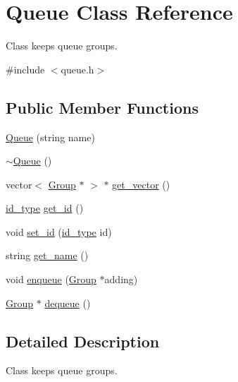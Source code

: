 \hypertarget{classQueue}{
\section{Queue Class Reference}
\label{d7/d56/classQueue}
}


Class keeps queue groups.  




{\ttfamily \#include $<$queue.h$>$}

\subsection*{Public Member Functions}
\begin{DoxyCompactItemize}
\item 
\hyperlink{classQueue_aee8e0d9677cef92e34f0347b73f64c97}{Queue} (string name)
\item 
\hyperlink{classQueue_a00d119db8fa3050da37746e82cbcf94f}{$\sim$Queue} ()
\item 
vector$<$ \hyperlink{classGroup}{Group} $\ast$ $>$ $\ast$ \hyperlink{classQueue_a6de27cfb498b3bc6000f63599f124c53}{get\_\-vector} ()
\item 
\hyperlink{types_8h_a0b60c08a3ab1435cccc5643d32d8ccee}{id\_\-type} \hyperlink{classQueue_a69f2c1cee4763ed7671a4710cc9748c2}{get\_\-id} ()
\item 
void \hyperlink{classQueue_ad29a81e51660af6071684ad3c5b063f1}{set\_\-id} (\hyperlink{types_8h_a0b60c08a3ab1435cccc5643d32d8ccee}{id\_\-type} id)
\item 
string \hyperlink{classQueue_ab68f53f6e69bbe4f82b581716dc247d8}{get\_\-name} ()
\item 
void \hyperlink{classQueue_a651cb053c98529502dc84def4638771a}{enqueue} (\hyperlink{classGroup}{Group} $\ast$adding)
\item 
\hyperlink{classGroup}{Group} $\ast$ \hyperlink{classQueue_ad5eb8f94bae1af72ad3391fea1821c8b}{dequeue} ()
\end{DoxyCompactItemize}


\subsection{Detailed Description}
Class keeps queue groups. 

